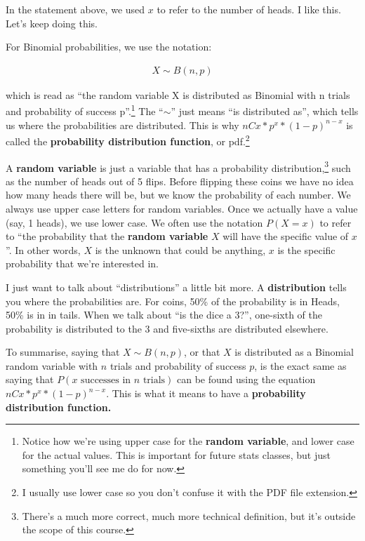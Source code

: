 \documentclass[
  letterpaper,
  DIV=11,
  numbers=noendperiod]{scrreprt}
\begin{document}
In the statement above, we used \(x\) to refer to the number of heads. I
like this. Let's keep doing this.

For Binomial probabilities, we use the notation:

\begin{align*}
X \sim B(n,p)
\end{align*}

which is read as ``the random variable X is distributed as Binomial with
n trials and probability of success p''.\footnote{Notice how we're using
  upper case for the \textbf{random variable}, and lower case for the
  actual values. This is important for future stats classes, but just
  something you'll see me do for now.} The ``\(\sim\)'' just means ``is
distributed as'', which tells us where the probabilities are
distributed. This is why \(nCx*p^x*(1-p)^{n-x}\) is called the
\textbf{probability distribution function}, or pdf.\footnote{I usually
  use lower case so you don't confuse it with the PDF file extension.}

A \textbf{random variable} is just a variable that has a probability
distribution,\footnote{There's a much more correct, much more technical
  definition, but it's outside the scope of this course.} such as the
number of heads out of 5 flips. Before flipping these coins we have no
idea how many heads there will be, but we know the probability of each
number. We always use upper case letters for random variables. Once we
actually have a value (say, 1 heads), we use lower case. We often use
the notation \(P(X = x)\) to refer to ``the probability that the
\textbf{random variable} \(X\) will have the specific value of \(x\)''.
In other words, \(X\) is the unknown that could be anything, \(x\) is
the specific probability that we're interested in.

I just want to talk about ``distributions'' a little bit more. A
\textbf{distribution} tells you where the probabilities are. For coins,
50\% of the probability is in Heads, 50\% is in in tails. When we talk
about ``is the dice a 3?'', one-sixth of the probability is distributed
to the 3 and five-sixths are distributed elsewhere.

To summarise, saying that \(X \sim B(n,p)\), or that \(X\) is
distributed as a Binomial random variable with \(n\) trials and
probability of success \(p\), is the exact same as saying that
\(P(x\text{ successes in }n\text{ trials})\) can be found using the
equation \(nCx*p^x*(1-p)^{n-x}\). This is what it means to have a
\textbf{probability distribution function.}
\end{document}
